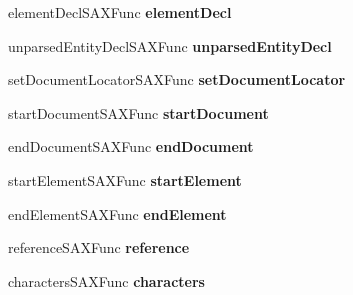 \begin{DoxyCompactItemize}
\item 
\hypertarget{struct__xml_s_a_x_handler_v1_a3248ebecb4a1b7eec246a535fe6bf08a}{element\-Decl\-S\-A\-X\-Func {\bfseries element\-Decl}}\label{struct__xml_s_a_x_handler_v1_a3248ebecb4a1b7eec246a535fe6bf08a}

\item 
\hypertarget{struct__xml_s_a_x_handler_v1_a91fa23c451584de06af7c0755e63e310}{unparsed\-Entity\-Decl\-S\-A\-X\-Func {\bfseries unparsed\-Entity\-Decl}}\label{struct__xml_s_a_x_handler_v1_a91fa23c451584de06af7c0755e63e310}

\item 
\hypertarget{struct__xml_s_a_x_handler_v1_ac607d4e2516d15e6ec10ea276ecdbfb2}{set\-Document\-Locator\-S\-A\-X\-Func {\bfseries set\-Document\-Locator}}\label{struct__xml_s_a_x_handler_v1_ac607d4e2516d15e6ec10ea276ecdbfb2}

\item 
\hypertarget{struct__xml_s_a_x_handler_v1_a1093326e92c519ef0298ab822933d2b1}{start\-Document\-S\-A\-X\-Func {\bfseries start\-Document}}\label{struct__xml_s_a_x_handler_v1_a1093326e92c519ef0298ab822933d2b1}

\item 
\hypertarget{struct__xml_s_a_x_handler_v1_a1cbd8f841c309cfc63973e75650a5aaf}{end\-Document\-S\-A\-X\-Func {\bfseries end\-Document}}\label{struct__xml_s_a_x_handler_v1_a1cbd8f841c309cfc63973e75650a5aaf}

\item 
\hypertarget{struct__xml_s_a_x_handler_v1_a311b1f74f2f6d0d167addfc49d39a435}{start\-Element\-S\-A\-X\-Func {\bfseries start\-Element}}\label{struct__xml_s_a_x_handler_v1_a311b1f74f2f6d0d167addfc49d39a435}

\item 
\hypertarget{struct__xml_s_a_x_handler_v1_ab62cf4d2df8209f439865179aaa641b9}{end\-Element\-S\-A\-X\-Func {\bfseries end\-Element}}\label{struct__xml_s_a_x_handler_v1_ab62cf4d2df8209f439865179aaa641b9}

\item 
\hypertarget{struct__xml_s_a_x_handler_v1_a88ed76850bc465258f158010f0c3c9be}{reference\-S\-A\-X\-Func {\bfseries reference}}\label{struct__xml_s_a_x_handler_v1_a88ed76850bc465258f158010f0c3c9be}

\item 
\hypertarget{struct__xml_s_a_x_handler_v1_a151b79b5c8ee8e05e10d69cb53953800}{characters\-S\-A\-X\-Func {\bfseries characters}}\label{struct__xml_s_a_x_handler_v1_a151b79b5c8ee8e05e10d69cb53953800}


\end{DoxyCompactItemize}
